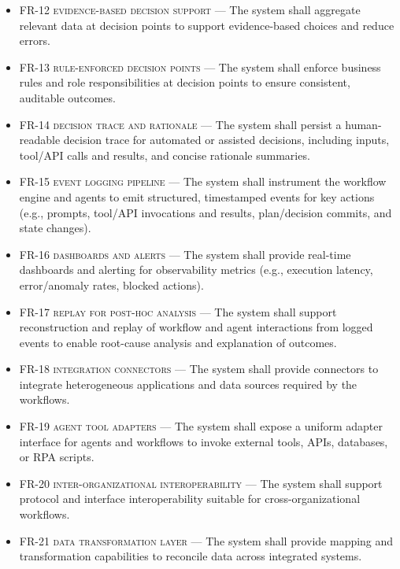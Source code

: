 \begin{footnotesize}
\begin{itemize}
        \item \textsc{FR-12 evidence-based decision support} --- The system shall aggregate relevant data at decision points to support evidence-based choices and reduce errors.
        \item \textsc{FR-13 rule-enforced decision points} --- The system shall enforce business rules and role responsibilities at decision points to ensure consistent, auditable outcomes.
        \item \textsc{FR-14 decision trace and rationale} --- The system shall persist a human-readable decision trace for automated or assisted decisions, including inputs, tool/API calls and results, and concise rationale summaries.
        \item \textsc{FR-15 event logging pipeline} --- The system shall instrument the workflow engine and agents to emit structured, timestamped events for key actions (e.g., prompts, tool/API invocations and results, plan/decision commits, and state changes).
        \item \textsc{FR-16 dashboards and alerts} --- The system shall provide real-time dashboards and alerting for observability metrics (e.g., execution latency, error/anomaly rates, blocked actions).
        \item \textsc{FR-17 replay for post-hoc analysis} --- The system shall support reconstruction and replay of workflow and agent interactions from logged events to enable root-cause analysis and explanation of outcomes.
        \item \textsc{FR-18 integration connectors} --- The system shall provide connectors to integrate heterogeneous applications and data sources required by the workflows.
        \item \textsc{FR-19 agent tool adapters} --- The system shall expose a uniform adapter interface for agents and workflows to invoke external tools, APIs, databases, or RPA scripts.
        \item \textsc{FR-20 inter-organizational interoperability} --- The system shall support protocol and interface interoperability suitable for cross-organizational workflows.
        \item \textsc{FR-21 data transformation layer} --- The system shall provide mapping and transformation capabilities to reconcile data across integrated systems.
    \end{itemize}


\end{footnotesize}

